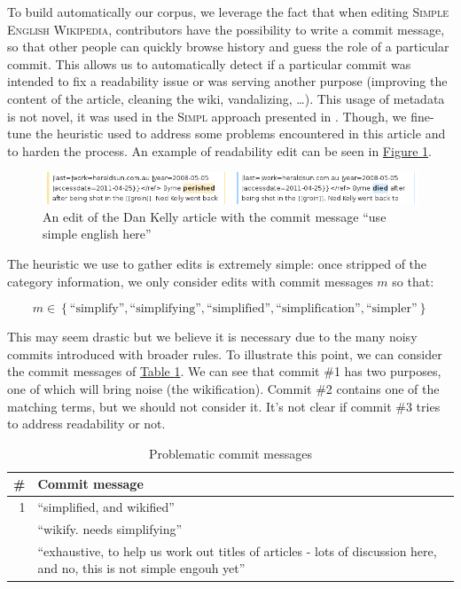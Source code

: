 \documentclass[a4paper, 11pt, onepage]{scrreprt}
\newcommand\sew{\textsc{Simple English Wikipedia}}
\newcommand\tableref[1]{\hyperref[#1]{Table \ref*{#1}}}
\newcommand\figureref[1]{\hyperref[#1]{Figure \ref*{#1}}}
\begin{document}
To build automatically our corpus, we leverage the fact that when
editing \sew, contributors have the possibility to write a commit
message, so that other people can quickly browse history and guess the
role of a particular commit. This allows us to automatically detect if
a particular commit was intended to fix a readability issue or was
serving another purpose (improving the content of the article,
cleaning the wiki, vandalizing, …). This usage of metadata is not
novel, it was used in the \textsc{Simpl} approach presented in
\cite{yatskar2010sake}. Though, we fine-tune the heuristic used to
address some problems encountered in this article and to harden the
process. An example of readability edit can be seen in
\figureref{fig:dan-kelly}.

\begin{figure}[H]
  \centering
  \includegraphics[width=\textwidth]{dan-kelly}
  \caption{An edit of the Dan Kelly article with the commit message
    “use simple english here”}
  \label{fig:dan-kelly}
\end{figure}

The heuristic we use to gather edits is extremely simple: once
stripped of the category information, we only consider edits with
commit messages $m$ so that:

\[
m \in \left\{\text{“simplify”}, \text{“simplifying”},
  \text{“simplified”}, \text{“simplification”},
  \text{“simpler”}\right\}
\]

This may seem drastic but we believe it is necessary due to the many
noisy commits introduced with broader rules. To illustrate this point,
we can consider the commit messages of
\tableref{tab:problematic-commits}. We can see that commit \#1 has two
purposes, one of which will bring noise (the wikification). Commit \#2
contains one of the matching terms, but we should not consider
it. It's not clear if commit \#3 tries to address readability or not.

\begin{table}[H]
  \centering
  \caption{Problematic commit messages}
  \begin{tabular}{rp{12cm}}
    \toprule
    \# & Commit message \\
    \midrule
    1 & “simplified, and wikified” \\
    \addlinespace
    2 & “wikify. needs simplifying” \\
    \addlinespace
    3 & “exhaustive, to help us work out titles of articles - lots of
    discussion here, and no, this is not simple engouh yet” \\
  \end{tabular}
  \label{tab:problematic-commits}
\end{table}
\end{document}

